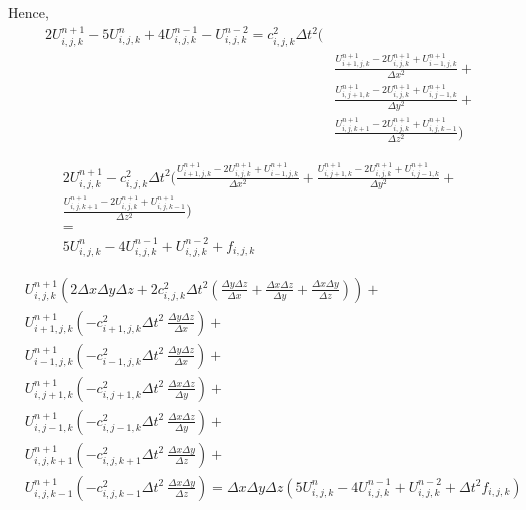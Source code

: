 \documentclass[12pt,a4paper]{report}
\begin{document}
Hence,
\begin{equation}
\begin{aligned}
2 U^{n+1}_{i,j,k} - 5 U^{n}_{i,j,k} + 4 U^{n-1}_{i,j,k} - U^{n-2}_{i,j,k} = c^2_{i,j,k} \Delta t^2 (\\
& \frac{U^{n+1}_{i+1,j,k} - 2 U^{n+1}_{i,j,k} + U^{n+1}_{i-1,j,k}}{\Delta x^2} +\\
& \frac{U^{n+1}_{i,j+1,k} - 2 U^{n+1}_{i,j,k} + U^{n+1}_{i,j-1,k}}{\Delta y^2} + \\
& \frac{U^{n+1}_{i,j,k+1} - 2 U^{n+1}_{i,j,k} + U^{n+1}_{i,j,k-1}}{\Delta z^2} )
\end{aligned}
\end{equation}

\begin{equation}
\begin{aligned}
2 U^{n+1}_{i,j,k} - c^2_{i,j,k} \Delta t^2 (
\frac{U^{n+1}_{i+1,j,k} - 2 U^{n+1}_{i,j,k} + U^{n+1}_{i-1,j,k}}{\Delta x^2} +
\frac{U^{n+1}_{i,j+1,k} - 2 U^{n+1}_{i,j,k} + U^{n+1}_{i,j-1,k}}{\Delta y^2} + \\
\frac{U^{n+1}_{i,j,k+1} - 2 U^{n+1}_{i,j,k} + U^{n+1}_{i,j,k-1}}{\Delta z^2} ) \\= \\ 5 U^{n}_{i,j,k} - 4 U^{n-1}_{i,j,k} + U^{n-2}_{i,j,k} + f_{i,j,k}
\end{aligned}
\end{equation}
\fi

\begin{equation}
\begin{aligned}
& U^{n+1}_{i,j,k} \left(2 \Delta x \Delta y \Delta z + 2 c^2_{i,j,k} \Delta t^2 \left( \frac{\Delta y \Delta z}{\Delta x} + \frac{\Delta x \Delta z}{\Delta y}+ \frac{\Delta x \Delta y}{\Delta z}\right)\right) + \\
& U^{n+1}_{i+1,j,k}  \left( -c^2_{i+1,j,k} \Delta t^2\ \frac{\Delta y \Delta z}{\Delta x}\right) + \\
& U^{n+1}_{i-1,j,k}  \left( -c^2_{i-1,j,k} \Delta t^2\ \frac{\Delta y \Delta z}{\Delta x}\right) + \\
& U^{n+1}_{i,j+1,k}  \left( -c^2_{i,j+1,k} \Delta t^2\ \frac{\Delta x \Delta z}{\Delta y}\right) + \\
& U^{n+1}_{i,j-1,k}  \left( -c^2_{i,j-1,k} \Delta t^2\ \frac{\Delta x \Delta z}{\Delta y}\right) + \\
& U^{n+1}_{i,j,k+1}  \left( -c^2_{i,j,k+1} \Delta t^2\ \frac{\Delta x \Delta y}{\Delta z}\right) + \\
& U^{n+1}_{i,j,k-1}  \left( -c^2_{i,j,k-1} \Delta t^2\ \frac{\Delta x \Delta y}{\Delta z}\right) = 
\Delta x \Delta y \Delta z \left( 5 U^{n}_{i,j,k} - 4 U^{n-1}_{i,j,k} + U^{n-2}_{i,j,k} + \Delta t^2 f_{i,j,k} \right)
\end{aligned}
\end{equation}
\end{document}
